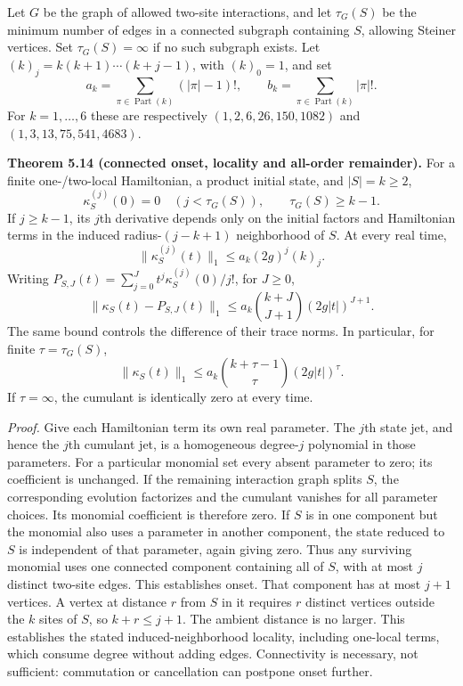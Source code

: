 \documentclass[
  11pt,
]{article}
\begin{document}
Let \(G\) be the graph of allowed two-site interactions, and let
\(\tau_G(S)\) be the minimum number of edges in a connected subgraph containing
\(S\), allowing Steiner vertices. Set \(\tau_G(S)=\infty\) if no such subgraph
exists. Let \((k)_j=k(k+1)\cdots(k+j-1)\), with \((k)_0=1\), and set
\[
a_k=\sum_{\pi\in\operatorname{Part}(k)}(|\pi|-1)!,\qquad
b_k=\sum_{\pi\in\operatorname{Part}(k)}|\pi|!.
\]
For \(k=1,\ldots,6\) these are respectively
\((1,2,6,26,150,1082)\) and \((1,3,13,75,541,4683)\).

\textbf{Theorem 5.14 (connected onset, locality and all-order remainder).} For a
finite one-/two-local Hamiltonian, a product initial state, and \(|S|=k\ge2\),
\[
\kappa_S^{(j)}(0)=0\quad(j<\tau_G(S)),\qquad \tau_G(S)\ge k-1.
\]
If \(j\ge k-1\), its \(j\)th derivative depends only on the initial factors and
Hamiltonian terms in the induced radius-\((j-k+1)\) neighborhood of \(S\).
At every real time,
\[
\lVert \kappa_S^{(j)}(t)\rVert_1\le a_k(2g)^j(k)_j.
\]
Writing \(P_{S,J}(t)=\sum_{j=0}^Jt^j\kappa_S^{(j)}(0)/j!\), for \(J\ge0\),
\[
\lVert \kappa_S(t)-P_{S,J}(t)\rVert_1
 \le a_k\binom{k+J}{J+1}(2g|t|)^{J+1}.
\]
The same bound controls the difference of their trace norms. In particular,
for finite \(\tau=\tau_G(S)\),
\[
\lVert \kappa_S(t)\rVert_1\le a_k\binom{k+\tau-1}{\tau}(2g|t|)^\tau.
\]
If \(\tau=\infty\), the cumulant is identically zero at every time.

\emph{Proof.} Give each Hamiltonian term its own real parameter. The \(j\)th state
jet, and hence the \(j\)th cumulant jet, is a homogeneous degree-\(j\) polynomial
in those parameters. For a particular monomial set every absent parameter to
zero; its coefficient is unchanged. If the remaining interaction graph splits
\(S\), the corresponding evolution factorizes and the cumulant vanishes for all
parameter choices. Its monomial coefficient is therefore zero. If \(S\) is in
one component but the monomial also uses a parameter in another component,
the state reduced to \(S\) is independent of that parameter, again giving zero.
Thus any surviving monomial uses one connected component containing all of
\(S\), with at most \(j\) distinct two-site edges. This establishes onset. That component
has at most \(j+1\) vertices. A vertex at distance \(r\) from \(S\) in it requires
\(r\) distinct vertices outside the \(k\) sites of \(S\), so \(k+r\le j+1\).
The ambient distance is no larger. This establishes the stated induced-neighborhood
locality, including one-local terms, which consume degree without adding edges.
Connectivity is necessary, not sufficient: commutation or cancellation can
postpone onset further.
\end{document}
